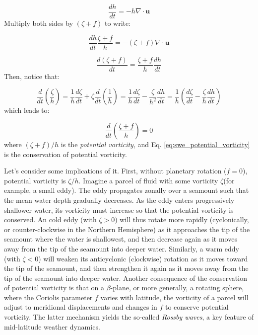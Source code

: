 \documentclass[12pt]{article}
\numberwithin{equation}{section}
\numberwithin{figure}{section}
\numberwithin{table}{section}
\begin{document}
\begin{equation}
  \frac{dh}{dt} = -h \nabla \cdot \mathbf{u}
\end{equation}
Multiply both sides by $(\zeta + f)$ to write:

\begin{equation}
  \frac{dh}{dt} \frac{\zeta + f}{h} = - \left(\zeta + f\right) \nabla \cdot \mathbf{u}
\end{equation}

\begin{equation}
  \frac{d(\zeta + f)}{dt} = \frac{\zeta + f}{h} \frac{dh}{dt}
\end{equation}
Then, notice that:

\begin{equation}
  \frac{d}{dt} \left( \frac{\zeta}{h} \right) =
  \frac{1}{h} \frac{d\zeta}{dt} +
  \zeta \frac{d}{dt} \left( \frac{1}{h} \right) =
  \frac{1}{h} \frac{d\zeta}{dt} -
  \frac{\zeta}{h^2} \frac{dh}{dt} =
  \frac{1}{h} \left( \frac{d\zeta}{dt} - \frac{\zeta}{h} \frac{dh}{dt} \right)
\end{equation}
which leads to:

\begin{equation}
  \frac{d}{dt} \left( \frac{\zeta + f}{h} \right) = 0
  \label{eq:swe_potential_vorticity}
\end{equation}
where $(\zeta + f)/h$ is the \textit{potential vorticity},
and Eq. \ref{eq:swe_potential_vorticity} is the conservation of potential
vorticity.

Let's consider some implications of it.
First, without planetary rotation ($f = 0$), potential vorticity is $\zeta/h$.
Imagine a parcel of fluid with some vorticity $\zeta $(for example, a small eddy).
The eddy propagates zonally over a seamount such that the mean water depth
gradually decreases.
As the eddy enters progressively shallower water, its vorticity must increase
so that the potential vorticity is conserved.
An cold eddy (with $\zeta > 0$) will thus rotate more rapidly (cyclonically, or
counter-clockwise in the Northern Hemisphere) as it approaches the tip of the
seamount where the water is shallowest, and then decrease again as it moves away
from the tip of the seamount into deeper water.
Similarly, a warm eddy (with $\zeta < 0$) will weaken its anticyclonic (clockwise)
rotation as it moves toward the tip of the seamount, and then strengthen it again
as it moves away from the tip of the seamount into deeper water.
Another consequence of the conservation of potential vorticity is that on a
$\beta$-plane, or more generally, a rotating sphere, where the Coriolis
parameter $f$ varies with latitude, the vorticity of a parcel will adjust to
meridional displacements and changes in $f$ to conserve potential vorticity.
The latter mechanism yields the so-called
\textit{Rossby waves}, a key feature of mid-latitude weather
dynamics.
\end{document}
